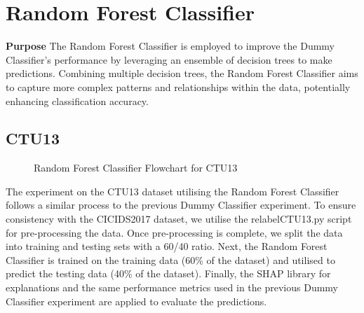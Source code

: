 \section{Random Forest Classifier}\label{sec:RandomForestClassifier}
\textbf{Purpose} The Random Forest Classifier is employed to improve the Dummy Classifier's performance by leveraging an ensemble of decision trees to make predictions. Combining multiple decision trees, the Random Forest Classifier aims to capture more complex patterns and relationships within the data, potentially enhancing classification accuracy.

\subsection{CTU13}\label{subsec:RandomForestClassifierCTU13}
\begin{figure}[H]
\centering
{}
\caption{Random Forest Classifier Flowchart for CTU13}\label{fig:RandomForestFlowCTU13}
\end{figure}

The experiment on the CTU13 dataset utilising the Random Forest Classifier follows a similar process to the previous Dummy Classifier experiment. To ensure consistency with the CICIDS2017 dataset, we utilise the relabelCTU13.py script for pre-processing the data. Once pre-processing is complete, we split the data into training and testing sets with a 60/40 ratio. Next, the Random Forest Classifier is trained on the training data (60\% of the dataset) and utilised to predict the testing data (40\% of the dataset). Finally, the SHAP library for explanations and the same performance metrics used in the previous Dummy Classifier experiment are applied to evaluate the predictions.

